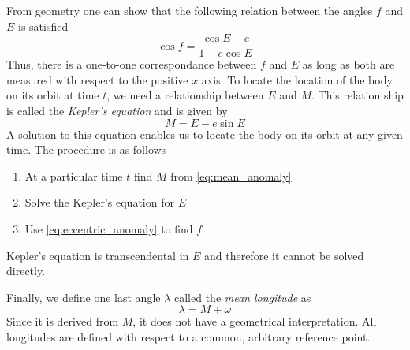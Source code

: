 \documentclass[ twoside,openright,titlepage,numbers=noenddot,headinclude,%
                footinclude=true,cleardoublepage=empty,abstractoff, %
                BCOR=5mm,paper=a4,fontsize=11pt,%
                american,%
                ]{scrreprt}
\begin{document}
From geometry one can show that the following relation between the
angles $f$ and $E$ is satisfied
\begin{equation}
    \cos f= \frac{\cos E -e}{1-e\cos E} 
    \label{eq:eccentric_anomaly}
\end{equation}
Thus, there is a one-to-one correspondance between $f$ and $E$ as long as
both are measured with respect to the positive $x$ axis. To 
locate the location of the body on its orbit at time $t$, we need
a relationship between $E$ and $M$. This relation ship is called
the \emph{Kepler's equation} and is given by \citep{murray}
\begin{equation}
    M=E-e\sin E
    \label{eq:kepler_equation}
\end{equation}
A solution to this equation enables us to locate the body on its orbit
at any given time. The procedure is as follows
\begin{enumerate}
    \item At a particular time $t$ find $M$ from \cref{eq:mean_anomaly}
    \item Solve the Kepler's equation for $E$
    \item Use \cref{eq:eccentric_anomaly} to find $f$
\end{enumerate}
Kepler's equation is transcendental in $E$ and therefore it cannot
be solved directly. 

Finally, we define one last angle $\lambda$ called the
\emph{mean longitude} as
\begin{equation}
    \lambda =M +\omega
\end{equation}
Since it is derived from $M$, it does not have a geometrical 
interpretation. All longitudes are defined with respect to a 
common, arbitrary reference point.
\end{document}

